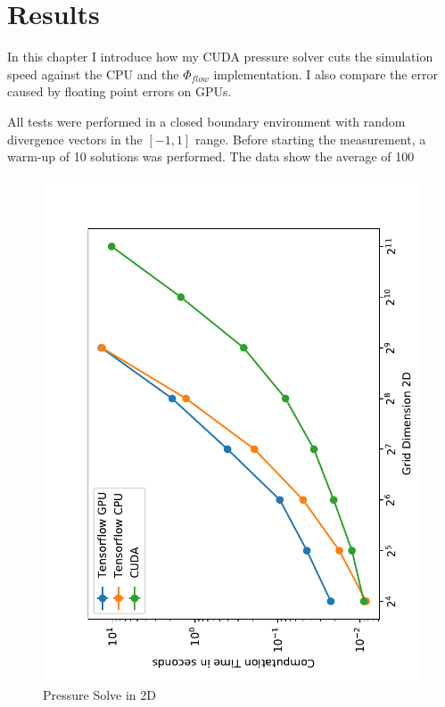 \chapter{Results}\label{chapter:results}

In this chapter I introduce how my CUDA pressure solver cuts the simulation speed against the CPU and the $\Phi_{flow}$ implementation. I also compare the error caused by floating point errors on GPUs.
\par All tests were performed in a closed boundary environment with random divergence vectors in the $\left[-1, 1 \right]$ range. Before starting the measurement, a warm-up of 10 solutions was performed. The data show the average of 100 

\begin{figure}[t]
    \centering
	\includegraphics[scale=1.15]{figures/Benchmark2D}

	\caption{Pressure Solve in 2D}
\end{figure}
